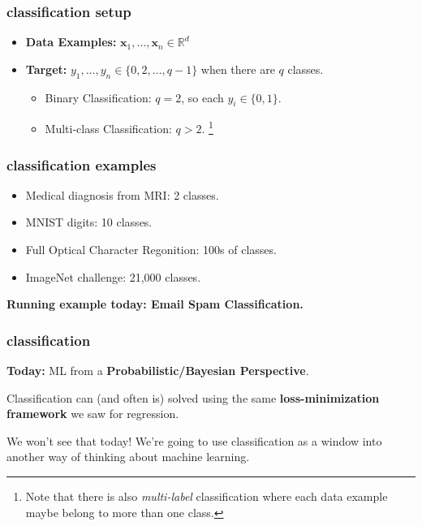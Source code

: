 \documentclass[handout,compress]{beamer}
\newcommand{\bv}[1]{\mathbf{#1}}
\newcommand{\R}{\mathbb{R}}
\begin{document}
\begin{frame}
	\frametitle{classification setup}
	\begin{itemize}
		\item \textbf{Data Examples:} $\bv{x}_1,\ldots, \bv{x}_n \in\R^d$
		\item \textbf{Target:} $y_1, \ldots, y_n \in \{0,2,\ldots, q-1\}$ when there are $q$ classes.
		\begin{itemize}
			\item Binary Classification: $q = 2$, so each $y_i \in \{0,1\}$.
			\item Multi-class Classification: $q > 2$. \footnote{Note that there is also \emph{multi-label} classification where each data example maybe belong to more than one class.}
		\end{itemize}
	\end{itemize}
\end{frame}

\begin{frame}
	\frametitle{classification examples}
	\begin{itemize}
		\item Medical diagnosis from MRI: 2 classes.
		\item MNIST digits: 10 classes.
		\item Full Optical Character Regonition: 100s of classes.
		\item ImageNet challenge: 21,000 classes.
	\end{itemize}
\begin{center}
	\textbf{Running example today: \alert{Email Spam Classification.}}
\end{center}
\end{frame}

\begin{frame}
	\frametitle{classification}
	\begin{center}
		\textbf{Today:} ML from a \textbf{\alert{Probabilistic/Bayesian Perspective}}.
	\end{center} 
	
	\begin{center}
	Classification can (and often is) solved using the same \textbf{loss-minimization framework} we saw for regression. 
	\end{center}

	We won't see that today! We're going to use classification as a window into another way of thinking about machine learning.
\end{frame}
\end{document}
